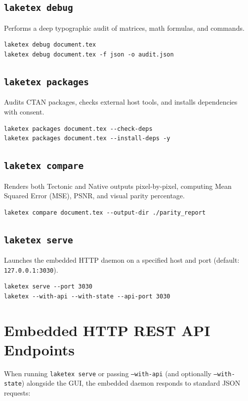 \documentclass[11pt, a4paper]{article}
\begin{document}
\subsection{\texttt{laketex debug}}
Performs a deep typographic audit of matrices, math formulas, and commands.
\begin{verbatim}
laketex debug document.tex
laketex debug document.tex -f json -o audit.json
\end{verbatim}

\subsection{\texttt{laketex packages}}
Audits CTAN packages, checks external host tools, and installs dependencies with consent.
\begin{verbatim}
laketex packages document.tex --check-deps
laketex packages document.tex --install-deps -y
\end{verbatim}

\subsection{\texttt{laketex compare}}
Renders both Tectonic and Native outputs pixel-by-pixel, computing Mean Squared Error (MSE), PSNR, and visual parity percentage.
\begin{verbatim}
laketex compare document.tex --output-dir ./parity_report
\end{verbatim}

\subsection{\texttt{laketex serve}}
Launches the embedded HTTP daemon on a specified host and port (default: \texttt{127.0.0.1:3030}).
\begin{verbatim}
laketex serve --port 3030
laketex --with-api --with-state --api-port 3030
\end{verbatim}

\section{Embedded HTTP REST API Endpoints}

When running \texttt{laketex serve} or passing \texttt{--with-api} (and optionally \texttt{--with-state}) alongside the GUI, the embedded daemon responds to standard JSON requests:
\end{document}
